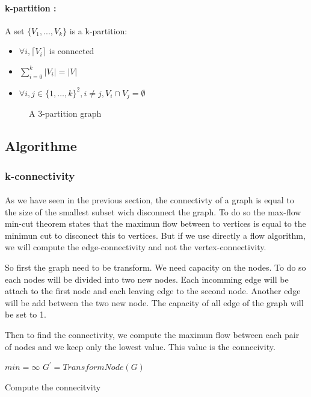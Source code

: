 \paragraph{k-partition :}
A set $\{V_1,...,V_k\}$ is a k-partition:
\begin{itemize}
    \item $\forall i, \lceil V_i \rceil$ is connected
    \item $\sum\limits_{i=0}^k|V_i| = |V|$
    \item $\forall i,j \in \{1, \dots, k\}^2, i \neq j, V_i \cap V_j = \emptyset$
\end{itemize}

\begin{figure}[!h]
    \begin{center}
        
    \end{center}
    \caption{A 3-partition graph}
\end{figure}

\subsection{Algorithme}
\subsubsection{k-connectivity}
\paragraph{}
As we have seen in the previous section, the connectivty of a graph is equal to the size of the smallest subset wich disconnect the graph.
To do so the max-flow min-cut theorem states that the maximun flow between to vertices is equal to the minimun cut to disconect this to vertices.
But if we use directly a flow algorithm, we will compute the edge-connectivity and not the vertex-connectivity.

So first the graph need to be transform. We need capacity on the nodes. To do so each nodes will be divided into two new nodes. Each incomming edge will be attach to the first node and each leaving edge to the second node. Another edge will be add between the two new node.
The capacity of all edge of the graph will be set to 1.

Then to find the connectivity, we compute the maximun flow between each pair of nodes and we keep only the lowest value. This value is the connecivity.


\begin{algorithm}[!h]
    $min = \infty$\;
    $G^{'} = TransformNode(G)$\;
    \;
    \caption{Compute the connecitvity}
\end{algorithm}

